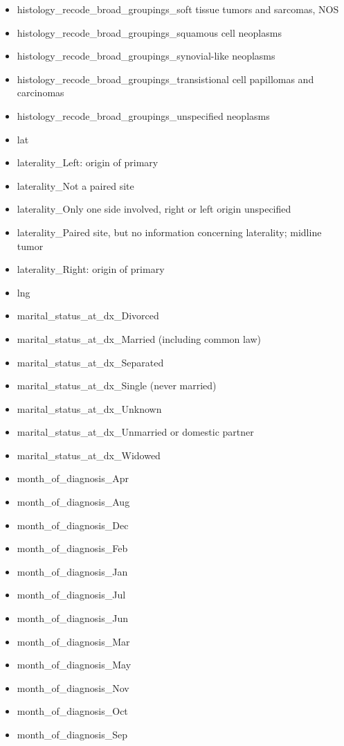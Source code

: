 \documentclass[a4paper,11pt]{article}
\begin{document}
\begin{itemize}[noitemsep]
\item histology\_recode\_broad\_groupings\_soft tissue tumors and sarcomas, NOS
\item histology\_recode\_broad\_groupings\_squamous cell neoplasms
\item histology\_recode\_broad\_groupings\_synovial-like neoplasms
\item histology\_recode\_broad\_groupings\_transistional cell papillomas and carcinomas
\item histology\_recode\_broad\_groupings\_unspecified neoplasms
\item lat
\item laterality\_Left: origin of primary
\item laterality\_Not a paired site
\item laterality\_Only one side involved, right or left origin unspecified
\item laterality\_Paired site, but no information concerning laterality; midline tumor
\item laterality\_Right: origin of primary
\item lng
\item marital\_status\_at\_dx\_Divorced
\item marital\_status\_at\_dx\_Married (including common law)
\item marital\_status\_at\_dx\_Separated
\item marital\_status\_at\_dx\_Single (never married)
\item marital\_status\_at\_dx\_Unknown
\item marital\_status\_at\_dx\_Unmarried or domestic partner
\item marital\_status\_at\_dx\_Widowed
\item month\_of\_diagnosis\_Apr
\item month\_of\_diagnosis\_Aug
\item month\_of\_diagnosis\_Dec
\item month\_of\_diagnosis\_Feb
\item month\_of\_diagnosis\_Jan
\item month\_of\_diagnosis\_Jul
\item month\_of\_diagnosis\_Jun
\item month\_of\_diagnosis\_Mar
\item month\_of\_diagnosis\_May
\item month\_of\_diagnosis\_Nov
\item month\_of\_diagnosis\_Oct
\item month\_of\_diagnosis\_Sep

\end{itemize}
\end{document}
